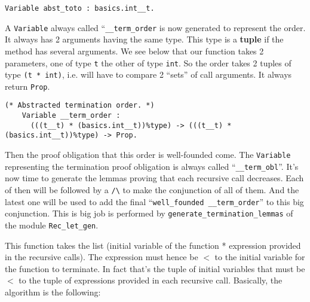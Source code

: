 {\footnotesize
\begin{lstlisting}[language=MyCoq]
    Variable abst_toto : basics.int__t.
\end{lstlisting}
}

A {\tt Variable} always called ``{\tt  \_\_term\_order} is now generated
to represent the order. It always has 2 arguments having the same
type. This type is a {\bf tuple} if the method has several arguments.
We see below that our function takes 2 parameters, one of type {\tt t}
the other of type {\tt int}. So the order takes 2 tuples of type
{\tt (t * int)}, i.e. will have to compare 2 ``sets'' of call
arguments. It always return {\tt Prop}.

{\footnotesize
\begin{lstlisting}[language=MyCoq]
    (* Abstracted termination order. *)
    Variable __term_order :
      (((t__t) * (basics.int__t))%type) -> (((t__t) * (basics.int__t))%type) -> Prop.
\end{lstlisting}
}

Then the proof obligation that this order is well-founded come. The
{\tt Variable} representing the termination proof obligation is always
called ``{\tt \_\_term\_obl}''.
It's now time to generate the lemmas proving that each recursive call
decreases. Each of then will be followed by a {\tt /\textbackslash} to make the
conjunction of all of them. And the latest one will be used to add 
the final ``{\tt well\_founded \_\_term\_order}'' to this big conjunction.
This is big job is performed by {\tt generate\_termination\_lemmas} of
the module {\tt Rec\_let\_gen}.

This function takes the list (initial variable of the function * expression provided
in the recursive calls). The expression must hence be $<$ to the
initial variable for the function to terminate. In fact that's the tuple of
initial variables that must be $<$ to the tuple of expressions provided
in each recursive call. Basically, the algorithm is the following:

